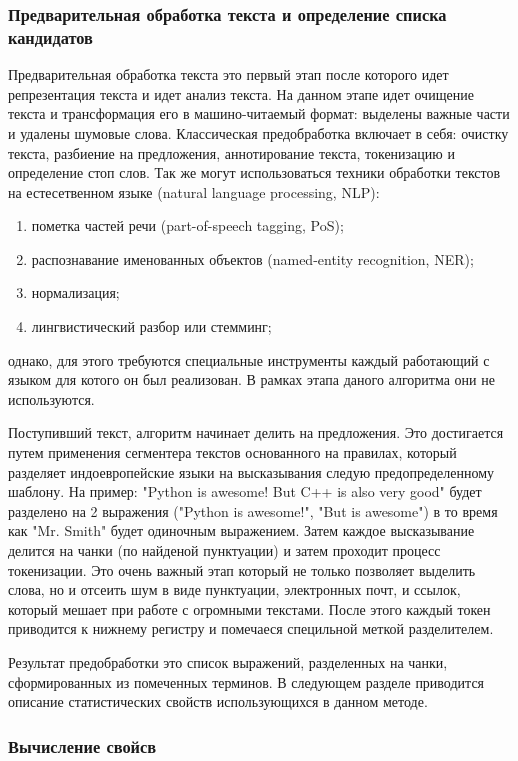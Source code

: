 \subsubsection{Предварительная обработка текста и определение списка кандидатов}
Предварительная обработка текста это первый этап после которого идет репрезентация текста и идет анализ текста.
На данном этапе идет очищение текста и трансформация его в машино-читаемый формат: выделены важные части и удалены шумовые слова.
Классическая предобработка включает в себя: очистку текста, разбиение на предложения, аннотирование текста, токенизацию и определение стоп слов.
Так же могут использоваться техники обработки текстов на естесетвенном языке (natural language processing, NLP): 
\begin{enumerate}
	\item пометка частей речи (part-of-speech tagging, PoS);
	\item распознавание именованных объектов (named-entity recognition, NER);
	\item нормализация;
	\item лингвистический разбор или стемминг;
\end{enumerate}
однако, для этого требуются специальные инструменты каждый работающий с языком для котого он был реализован.
В рамках этапа даного алгоритма они не используются.

Поступивший текст, алгоритм начинает делить на предложения. 
Это достигается путем применения сегментера текстов основанного на правилах, который разделяет индоевропейские языки на высказывания следую предопределенному шаблону.
На пример: "Python is awesome! But C++ is also very good" будет разделено на 2 выражения ("Python is awesome!", "But is awesome") в то время как "Mr. Smith" будет одиночным выражением.
Затем каждое высказывание делится на чанки (по найденой пунктуации) и затем проходит процесс токенизации.
Это очень важный этап который не только позволяет выделить слова, но и отсеить шум в виде пунктуации, электронных почт, и ссылок, который мешает при работе с огромными текстами.
После этого каждый токен приводится к нижнему регистру и помечаеся специльной меткой разделителем.

Результат предобработки это список выражений, разделенных на чанки, сформированных из помеченных терминов.
В следующем разделе приводится описание статистических свойств использующихся в данном методе.

\subsubsection{Вычисление свойсв}

